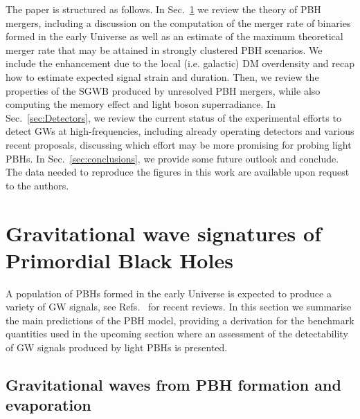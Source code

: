 \documentclass[11pt,a4paper]{article}
\begin{document}
The paper is structured as follows. 
%
In Sec.~\ref{sec:PBHmergers} we review the theory of PBH mergers, 
including a discussion on the computation of the merger rate of binaries formed in the early Universe as well as an estimate of the maximum theoretical merger rate that may be attained in strongly clustered PBH scenarios. 
We include the enhancement due to the local (i.e. galactic) DM overdensity and recap how to estimate expected signal strain and duration. 
Then, we review the properties of the SGWB produced by unresolved PBH mergers, while also computing the memory effect and light boson superradiance.
%
In Sec.~\ref{sec:Detectors}, we review the current status of the experimental efforts to detect GWs at high-frequencies, including already operating detectors and various recent proposals, discussing which effort may be more promising for probing light PBHs. 
%
In Sec.~\ref{sec:conclusions}, we provide some future outlook and conclude. 
The data needed to reproduce the figures in this work are available upon request to the authors.


\section{Gravitational wave signatures of Primordial Black Holes}
\label{sec:PBHmergers}

A population of PBHs formed in the early Universe is expected to produce a variety of GW signals, see Refs.~\cite{Green:2020jor,Carr:2020xqk,Franciolini:2021nvv} for recent reviews. 
In this section we summarise the main predictions of the PBH model, providing a derivation for the benchmark quantities used in the upcoming section where 
an assessment of the detectability of GW signals produced by light PBHs is presented. 

\subsection{Gravitational waves from PBH formation and evaporation}
\end{document}
